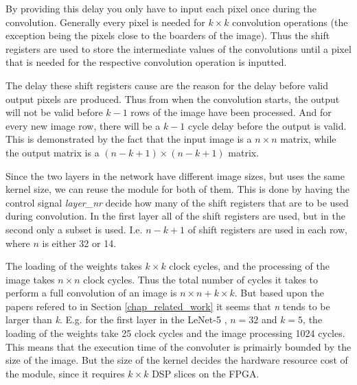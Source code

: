 By providing this delay you only have to input each pixel once during the convolution. Generally every pixel is needed for $ k \times k $ convolution operations (the exception being the pixels close to the boarders of the image). Thus the shift registers are used to store the intermediate values of the convolutions until a pixel that is needed for the respective convolution operation is inputted. 

The delay these shift registers cause are the reason for the delay before valid output pixels are produced. Thus from when the convolution starts, the output will not be valid before $ k-1 $ rows of the image have been processed. And for every new image row, there will be a $ k-1 $ cycle delay before the output is valid. This is demonstrated by the fact that the input image is a $ n \times n $ matrix, while the output matrix is a $ (n-k+1) \times (n-k+1) $ matrix. 

Since the two layers in the network have different image sizes, but uses the same kernel size, we can reuse the module for both of them. This is done by having the control signal \textit{layer\_nr} decide how many of the shift registers that are to be used during convolution. In the first layer all of the shift registers are used, but in the second only a subset is used. I.e. $ n-k+1 $ of shift registers are used in each row, where $ n $ is either 32 or 14. 

The loading of the weights takes $ k \times k $ clock cycles, and the processing of the image takes $ n \times n $ clock cycles. Thus the total number of cycles it takes to perform a full convolution of an image is $ n \times n + k \times k $. But based upon the papers refered to in Section \ref{chap_related_work} it seems that \textit{n} tends to be larger than \textit{k}. E.g. for the first layer in the LeNet-5 \cite{LeCun1998}, $ n = 32 $ and $ k = 5 $, the loading  of the weights take 25 clock cycles and the image processing 1024 cycles. This means that the execution time of the convoluter is primairly bounded by the size of the image. But the size of the kernel decides the hardware resource cost of the module, since it requires $ k \times k $ DSP slices on the FPGA.

